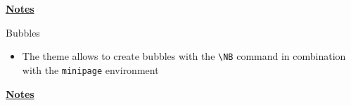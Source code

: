 \documentclass[10pt]{beamer}
\begin{document}
\begin{flushleft}
    \underline{\textbf{Notes}}\setlength{\parskip}{.15cm}\notesize\newline\par
\end{flushleft}

\begin{frame}
    {Bubbles}
    \begin{itemize}
        \item The theme allows to create bubbles with the \texttt{\textbackslash NB} command in combination with the \texttt{minipage} environment \bigskip
    \end{itemize}
    \begin{center}
        \begin{minipage}{.4\textwidth}
        \end{minipage}
    \end{center}
    \begin{center}
        \begin{minipage}{.6\textwidth}
        \end{minipage}
    \end{center}
    \begin{center}
        \begin{minipage}{.8\textwidth}
        \end{minipage}
    \end{center}
\end{frame}
\begin{flushleft}
    \underline{\textbf{Notes}}\setlength{\parskip}{.15cm}\notesize\newline\par
\end{flushleft}


\end{document}
